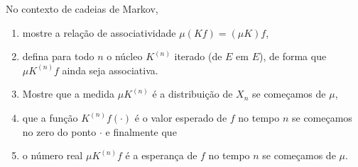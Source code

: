 \begin{topics}
\begin{exercise}
  No contexto de cadeias de Markov,
  \begin{enumerate}[\quad a)]
  \item mostre a relação de associatividade $\mu (K f) = (\mu K) f$,
  \item defina para todo $n$ o núcleo $K^{(n)}$ iterado (de $E$ em $E$), de forma que $\mu K^{(n)} f$ ainda seja associativa.
  \item Mostre que a medida $\mu K^{(n)}$ é a distribuição de $X_n$ se começamos de $\mu$,
  \item que a função $K^{(n)} f (\cdot)$ é o valor esperado de $f$ no tempo $n$ se começamos no zero do ponto $\cdot$ e finalmente que
  \item o número real $\mu K^{(n)} f$ é a esperança de $f$ no tempo $n$ se começamos de $\mu$.
  \end{enumerate}
\end{exercise}

\end{topics}

